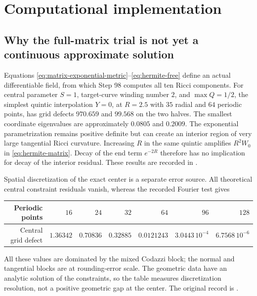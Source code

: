 \documentclass[a4paper,11pt]{article}
\numberwithin{equation}{section}
\theoremstyle{definition}
\begin{document}
\section{Computational implementation}
\subsection{Why the full-matrix trial is not yet a continuous approximate solution}\label{sec:matrix-pressure-test}
Equations \eqref{eq:matrix-exponential-metric}--\eqref{eq:hermite-free} define an actual differentiable field, from which Step 98 computes all ten Ricci components.
For central parameter $S=1$, target-curve winding number $2$, and $\max Q=1/2$, the simplest quintic interpolation $Y=0$, at $R=2.5$ with $35$ radial and $64$ periodic points, has grid defects $970.659$ and $99.568$ on the two halves.
The smallest coordinate eigenvalues are approximately $0.0805$ and $0.2009$.
The exponential parametrization remains positive definite but can create an interior region of very large tangential Ricci curvature.
Increasing $R$ in the same quintic amplifies $R^2W_0$ in \eqref{eq:hermite-matrix}.
Decay of the end term $e^{-2R}$ therefore has no implication for decay of the interior residual.
These results are recorded in
.

Spatial discretization of the exact center is a separate error source.
All theoretical central constraint residuals vanish, whereas the recorded Fourier test gives
\begin{center}
\begin{tabular}{rrrrrrr}
\toprule Periodic points & $16$ & $24$ & $32$ & $64$ & $96$ & $128$\\\midrule
Central grid defect & $1.36342$ & $0.70836$ & $0.32885$ &
$0.0121243$ & $3.0443\,10^{-4}$ & $6.7568\,10^{-6}$\\\bottomrule
\end{tabular}
\end{center}
All these values are dominated by the mixed Codazzi block; the normal and tangential blocks are at rounding-error scale.
The geometric data have an analytic solution of the constraints, so the table measures discretization resolution, not a positive geometric gap at the center.
The original record is
.
\end{document}
